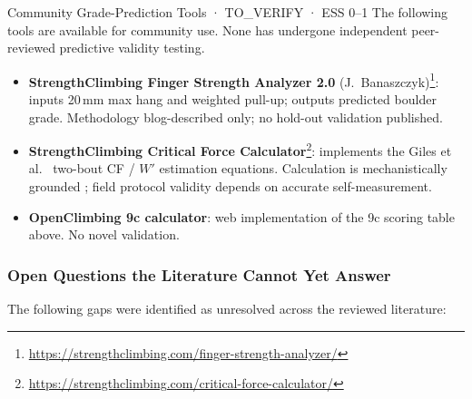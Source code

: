 \begin{toverifybox}{Community Grade-Prediction Tools · TO\_VERIFY · ESS 0--1}
The following tools are available for community use. None has undergone independent peer-reviewed predictive validity testing.
\begin{itemize}
  \item \textbf{StrengthClimbing Finger Strength Analyzer 2.0} (J.\ Banaszczyk)\footnote{\url{https://strengthclimbing.com/finger-strength-analyzer/}}: inputs 20\,mm max hang and weighted pull-up; outputs predicted boulder grade. Methodology blog-described only; no hold-out validation published.
  \item \textbf{StrengthClimbing Critical Force Calculator}\footnote{\url{https://strengthclimbing.com/critical-force-calculator/}}: implements the Giles et al.\ \cite{GCT+19} two-bout CF / $W'$ estimation equations. Calculation is mechanistically grounded \cite{GCT+19}; field protocol validity depends on accurate self-measurement.
  \item \textbf{OpenClimbing 9c calculator}: web implementation of the 9c scoring table above. No novel validation.
\end{itemize}
\end{toverifybox}

\subsubsection{Open Questions the Literature Cannot Yet Answer}

The following gaps were identified as unresolved across the reviewed literature:

